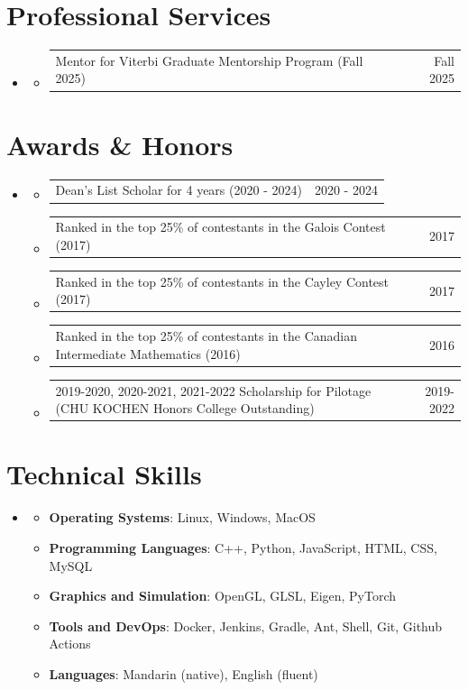 \documentclass[letterpaper,11pt]{article}
\newcommand{\resumeItem}[1]{
  \item\small{
    {#1 \vspace{-2pt}}
  }
}
\newcommand{\resumePoint}[2]{
  \item
    \begin{tabularx}{\linewidth}[t]{X r}
      \small{#1} & \small{#2} \\
    \end{tabularx}\vspace{-2pt}
}
\newcommand{\resumeSubHeadingListStart}{\begin{itemize}[leftmargin=0in, label={}]}
\newcommand{\resumeSubHeadingListEnd}{\end{itemize}}
\newcommand{\resumeItemListStart}{\begin{itemize}}
\newcommand{\resumeItemListEnd}{\end{itemize}\vspace{-5pt}}
\begin{document}
\section{Professional Services}
\resumeSubHeadingListStart
  \item
  \resumeItemListStart
    \resumePoint{Mentor for Viterbi Graduate Mentorship Program (Fall 2025)}{Fall 2025}
  \resumeItemListEnd
\resumeSubHeadingListEnd

\section{Awards \& Honors}
\resumeSubHeadingListStart
  \item 
  \resumeItemListStart
    \resumePoint{Dean's List Scholar for 4 years (2020 - 2024)}{2020 - 2024}
    \resumePoint{Ranked in the top 25\% of contestants in the Galois Contest (2017)}{2017}
    \resumePoint{Ranked in the top 25\% of contestants in the Cayley Contest (2017)}{2017}
    \resumePoint{Ranked in the top 25\% of contestants in the Canadian Intermediate Mathematics (2016)}{2016}
    \resumePoint{2019-2020, 2020-2021, 2021-2022 Scholarship for Pilotage (CHU KOCHEN Honors College Outstanding)}{2019-2022}
  \resumeItemListEnd
\resumeSubHeadingListEnd

\section{Technical Skills}
\resumeSubHeadingListStart
  \item
  \resumeItemListStart
    \resumeItem{\textbf{Operating Systems}{: Linux, Windows, MacOS}}
    \resumeItem{\textbf{Programming Languages}{: C++, Python, JavaScript, HTML, CSS, MySQL}}
    \resumeItem{ \textbf{Graphics and Simulation}{: OpenGL, GLSL, Eigen, PyTorch}}
    \resumeItem{\textbf{Tools and DevOps}{: Docker, Jenkins, Gradle, Ant, Shell, Git, Github Actions}}
    \resumeItem{\textbf{Languages}{: Mandarin (native), English (fluent)}}
  \resumeItemListEnd
\resumeSubHeadingListEnd


\end{document}

